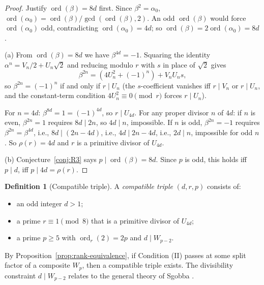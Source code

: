 \documentclass[12pt]{article}
\theoremstyle{plain}
\theoremstyle{definition}
\newtheorem{definition}[theorem]{Definition}
\theoremstyle{remark}
\begin{document}
\begin{proof}
Justify \(\operatorname{ord}(\beta) = 8d\) first. Since
\(\beta^2 = \alpha_0\), \(\operatorname{ord}(\alpha_0) =
\operatorname{ord}(\beta)/\gcd(\operatorname{ord}(\beta),2)\). An
odd \(\operatorname{ord}(\beta)\) would force
\(\operatorname{ord}(\alpha_0)\) odd, contradicting
\(\operatorname{ord}(\alpha_0) = 4d\); so
\(\operatorname{ord}(\beta) = 2\operatorname{ord}(\alpha_0) = 8d\).

(a) From \(\operatorname{ord}(\beta) = 8d\) we have
\(\beta^{4d} = -1\). Squaring the identity
\(\alpha^n = V_n/2 + U_n\sqrt{2}\) and reducing modulo \(r\) with
\(s\) in place of \(\sqrt 2\) gives
\[
\beta^{2n} = (4U_n^2 + (-1)^n) + V_n U_n s,
\]
so \(\beta^{2n} = (-1)^n\) if and only if \(r \mid U_n\) (the
\(s\)-coefficient vanishes iff \(r \mid V_n\) or \(r \mid U_n\), and
the constant-term condition \(4U_n^2 \equiv 0 \pmod r\) forces
\(r \mid U_n\)).

For \(n = 4d\): \(\beta^{8d} = 1 = (-1)^{4d}\), so \(r \mid U_{4d}\).
For any proper divisor \(n\) of \(4d\): if \(n\) is even,
\(\beta^{2n} = 1\) requires \(8d \mid 2n\), so \(4d \mid n\),
impossible. If \(n\) is odd, \(\beta^{2n} = -1\) requires
\(\beta^{2n} = \beta^{4d}\), i.e., \(8d \mid (2n - 4d)\), i.e.,
\(4d \mid 2n - 4d\), i.e., \(2d \mid n\), impossible for odd \(n\).
So \(\rho(r) = 4d\) and \(r\) is a primitive divisor of \(U_{4d}\).

(b) Conjecture~\ref{conj:R3} says \(p \mid \operatorname{ord}(\beta) = 8d\).
Since \(p\) is odd, this holds iff \(p \mid d\), iff
\(p \mid 4d = \rho(r)\).
\end{proof}
\begin{definition}[Compatible triple]\label{def:compatible-triple}
A \emph{compatible triple} \((d, r, p)\) consists of:
\begin{itemize}
\item an odd integer \(d > 1\);
\item a prime \(r \equiv 1 \pmod{8}\) that is a primitive divisor of
  \(U_{4d}\);
\item a prime \(p \geq 5\) with \(\operatorname{ord}_r(2) = 2p\) and
  \(d \mid W_{p-2}\).
\end{itemize}
\end{definition}


By Proposition~\ref{prop:rank-equivalence}, if Condition (II) passes at some split factor of
a composite \(W_p\), then a compatible triple exists. The divisibility
constraint \(d \mid W_{p-2}\) relates to the general theory of
Sgobba \cite{ref16}.
\end{document}
